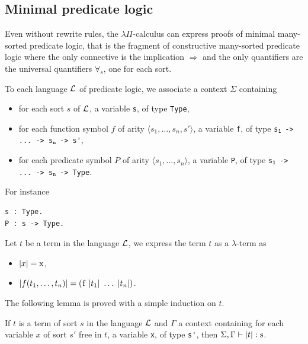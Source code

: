 \documentclass[english]{lipics}
\newcommand\fa{\forall}
\newcommand\lst[1]{{\rm \lstinline{#1}}}
\begin{document}
\subsection{Minimal predicate logic}
\label{minimal}

Even without rewrite rules, the $\lambda \Pi$-calculus can express
proofs of minimal many-sorted predicate logic, that is the fragment of
constructive many-sorted predicate logic where the only connective is
the implication $\Rightarrow$ and the only quantifiers are the
universal quantifiers $\fa_s$, one for each sort.

\begin{definition}
\label{deflangembedding1}
To each language ${\cal L}$ of predicate logic, we associate a context
$\Sigma$ containing
\begin{itemize}
\item for each sort $s$ of ${\cal L}$, a variable  \lst{s}, of type
\lst{Type},
\item for each function symbol $f$ of arity $\langle s_1, \ldots, s_n,
s'\rangle$, a variable \lst{f}, of type \linebreak
\lst{s}$_{\tt 1}$ \lst{-> ... -> s}$_{\tt n}$ \lst{-> s'},
\item for each predicate symbol $P$ of arity $\langle s_1, \ldots, s_n
\rangle$, a variable \lst{P}, of type \linebreak
\lst{s}$_{\tt 1}$ \lst{-> ... -> s}$_{\tt n}$ \lst{-> Type}.
\end{itemize}
\end{definition}

For instance
\begin{lstlisting}
s : Type.
P : s -> Type.
\end{lstlisting}

\begin{definition}
\label{def:termembedding}
Let $t$ be a term in the language ${\cal L}$,
we express the term $t$ as a $\lambda$-term as
\begin{itemize}
\item $|x| = \mbox{\lst{x}}$,
\item $|f(t_1, \ldots, t_n)| = (\mbox{\lst{f}}~|t_1|~\ldots~|t_n|)$.
\end{itemize}
\end{definition}

The following lemma is proved with a simple induction on $t$.

\begin{lemma}
If $t$ is a term of sort $s$ in the language ${\cal L}$ and
$\Gamma$ a context containing for each variable $x$ of sort
$s'$ free in $t$, a variable \lst{x}, of type \lst{s'}, then
$\Sigma, \Gamma \vdash |t|:\mbox{\lst{s}}$.
\end{lemma}
\end{document}
